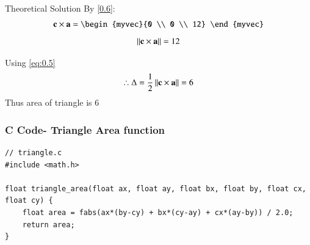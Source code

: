 \documentclass{beamer}
\begin{document}
\begin{frame}{Theoretical Solution}
By \eqref{0.6}:
\begin{align}
	\vec{c}\times\vec{a} = \begin{myvec}{0 \\ 0 \\ 12} \end{myvec}
\end{align}
\begin{align}
	\left\lVert\mathbf{c}\times\mathbf{a}\right\rVert = 12
\end{align}



Using \eqref{eq:0.5}
\begin{align}
	\therefore	\Delta = \frac{1}{2}\left\lVert\mathbf{c}\times\mathbf{a}\right\rVert = 6
\end{align}
Thus area of triangle is $6$\\

	\end{frame}

	\begin{frame}[fragile]
	\frametitle{C Code- Triangle Area function }
	
	\begin{lstlisting}
// triangle.c
#include <math.h>

float triangle_area(float ax, float ay, float bx, float by, float cx, float cy) {
	float area = fabs(ax*(by-cy) + bx*(cy-ay) + cx*(ay-by)) / 2.0;
	return area;
}
	\end{lstlisting}
\end{frame}
\end{document}
